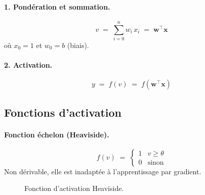 \paragraph{1. Pondération et sommation.}
\begin{equation}
	v \;=\; \sum_{i=0}^{n} w_i\,x_i
	\;=\; \mathbf{w}^\top \mathbf{x}
	\label{eq:potentiel}
\end{equation}
où $x_0 = 1$ et $w_0 = b$ (biais).

\paragraph{2. Activation.}
\begin{equation}
	y \;=\; f(v) \;=\; f\!\left(\mathbf{w}^\top \mathbf{x}\right)
	\label{eq:sortie_neurone}
\end{equation}

\subsection{Fonctions d'activation}

\paragraph{Fonction échelon (Heaviside).}
\begin{equation}
	f(v) \;=\; \begin{cases} 1 & v \geq \theta \\ 0 & \text{sinon}
	\end{cases}
\end{equation}
Non dérivable, elle est inadaptée à l'apprentissage par gradient.

\begin{figure}[H]
	\begin{center}
	\end{center}
	\caption{Fonction d'activation Heaviside.}
\end{figure}

